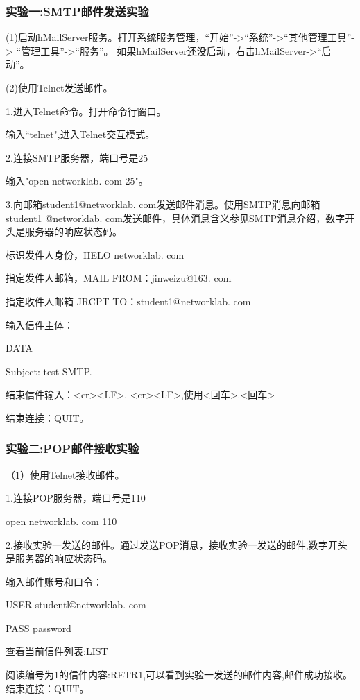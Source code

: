 \documentclass[lang=cn,11pt,a4paper,cite=authoryear]{elegantpaper}
\begin{document}
\subsubsection{实验一:SMTP邮件发送实验}
(1)启动hMailServer服务。打开系统服务管理，“开始”->“系统”->“其他管理工具”-> “管理工具”->“服务”。
如果hMailServer还没启动，右击hMailServer->“启动”。

(2)使用Telnet发送邮件。

1.进入Telnet命令。打开命令行窗口。

输入“telnet",进入Telnet交互模式。

2.连接SMTP服务器，端口号是25

输入"open networklab. com 25"。

3.向邮箱student1@networklab. com发送邮件消息。使用SMTP消息向邮箱student1 @networklab. com发送邮件，具体消息含义参见SMTP消息介绍，数字开头是服务器的响应状态码。

标识发件人身份，HELO networklab. com

指定发件人邮箱，MAIL FROM：jinweizu@163. com

指定收件人邮箱 JRCPT TO：student1@networklab. com

输入信件主体：

DATA

Subject: test SMTP.

结束信件输入：<cr><LF>. <cr><LF>,使用<回车>.<回车>

结束连接：QUIT。

\subsubsection{实验二:POP邮件接收实验}

（1）使用Telnet接收邮件。

1.连接POP服务器，端口号是110

open networklab. com 110

2.接收实验一发送的邮件。通过发送POP消息，接收实验一发送的邮件,数字开头是服务器的响应状态码。

输入邮件账号和口令：

USER studentl©networklab. com

PASS password 

查看当前信件列表:LIST

阅读编号为1的信件内容:RETR1,可以看到实验一发送的邮件内容,邮件成功接收。 结束连接：QUIT。
\end{document}

